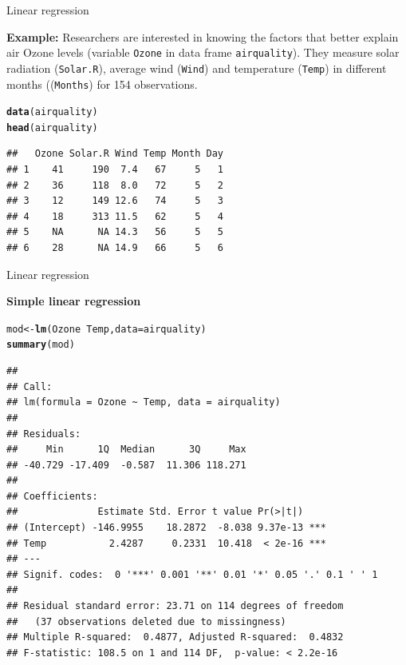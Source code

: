 \documentclass[10pt,xcolor=dvipsnames]{beamer}\usepackage[]{graphicx}\usepackage[]{color}
\makeatletter
\newcommand{\hlopt}[1]{\textcolor[rgb]{0,0,0}{#1}}%
\newcommand{\hlstd}[1]{\textcolor[rgb]{0.345,0.345,0.345}{#1}}%
\newcommand{\hlkwb}[1]{\textcolor[rgb]{0.69,0.353,0.396}{#1}}%
\newcommand{\hlkwc}[1]{\textcolor[rgb]{0.333,0.667,0.333}{#1}}%
\newcommand{\hlkwd}[1]{\textcolor[rgb]{0.737,0.353,0.396}{\textbf{#1}}}%
\newenvironment{kframe}{%
 \def\at@end@of@kframe{}%
 \ifinner\ifhmode%
  \def\at@end@of@kframe{\end{minipage}}%
  \begin{minipage}{\columnwidth}%
 \fi\fi%
 \def\FrameCommand##1{\hskip\@totalleftmargin \hskip-\fboxsep
 \colorbox{shadecolor}{##1}\hskip-\fboxsep
     \hskip-\linewidth \hskip-\@totalleftmargin \hskip\columnwidth}%
 \MakeFramed {\advance\hsize-\width
   \@totalleftmargin\z@ \linewidth\hsize
   \@setminipage}}%
 {\par\unskip\endMakeFramed%
 \at@end@of@kframe}
\newenvironment{knitrout}{}{} %
\makeatother
\begin{document}
\begin{frame}[fragile]{Linear regression}

\textbf{Example:} Researchers are interested in knowing the factors that better explain 
air Ozone levels (variable {\tt Ozone} in data frame {\tt airquality}). They measure 
solar radiation ({\tt Solar.R}), average wind ({\tt Wind}) and temperature ({\tt Temp})
in different months (({\tt Months}) for 154 observations.

\begin{knitrout}
\color{fgcolor}\begin{kframe}
\begin{alltt}
\hlkwd{data}\hlstd{(airquality)}
\hlkwd{head}\hlstd{(airquality)}
\end{alltt}
\begin{verbatim}
##   Ozone Solar.R Wind Temp Month Day
## 1    41     190  7.4   67     5   1
## 2    36     118  8.0   72     5   2
## 3    12     149 12.6   74     5   3
## 4    18     313 11.5   62     5   4
## 5    NA      NA 14.3   56     5   5
## 6    28      NA 14.9   66     5   6
\end{verbatim}
\end{kframe}
\end{knitrout}
\end{frame}


\begin{frame}[fragile]{Linear regression}

\textbf{Simple linear regression}
\begin{knitrout}
\color{fgcolor}\begin{kframe}
\begin{alltt}
\hlstd{mod} \hlkwb{<-} \hlkwd{lm}\hlstd{(Ozone} \hlopt{~} \hlstd{Temp,} \hlkwc{data}\hlstd{=airquality)}
\hlkwd{summary}\hlstd{(mod)}
\end{alltt}
\begin{verbatim}
## 
## Call:
## lm(formula = Ozone ~ Temp, data = airquality)
## 
## Residuals:
##     Min      1Q  Median      3Q     Max 
## -40.729 -17.409  -0.587  11.306 118.271 
## 
## Coefficients:
##              Estimate Std. Error t value Pr(>|t|)    
## (Intercept) -146.9955    18.2872  -8.038 9.37e-13 ***
## Temp           2.4287     0.2331  10.418  < 2e-16 ***
## ---
## Signif. codes:  0 '***' 0.001 '**' 0.01 '*' 0.05 '.' 0.1 ' ' 1
## 
## Residual standard error: 23.71 on 114 degrees of freedom
##   (37 observations deleted due to missingness)
## Multiple R-squared:  0.4877,	Adjusted R-squared:  0.4832 
## F-statistic: 108.5 on 1 and 114 DF,  p-value: < 2.2e-16
\end{verbatim}
\end{kframe}
\end{knitrout}
\end{frame}
\end{document}
